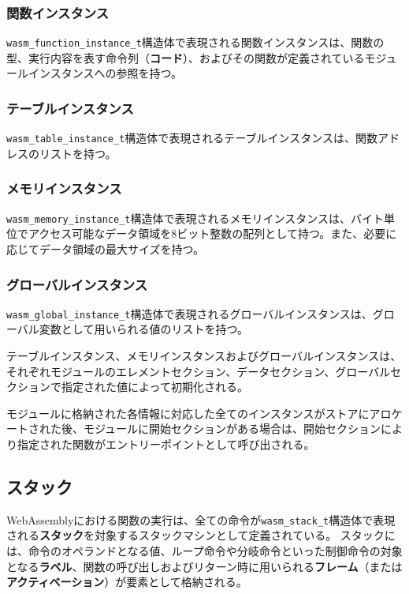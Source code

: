 \subsubsection{関数インスタンス}

\verb|wasm_function_instance_t|構造体で表現される関数インスタンスは、関数の型、実行内容を表す命令列（{\bf コード}）、およびその関数が定義されているモジュールインスタンスへの参照を持つ。

\subsubsection{テーブルインスタンス}

\verb|wasm_table_instance_t|構造体で表現されるテーブルインスタンスは、関数アドレスのリストを持つ。

\subsubsection{メモリインスタンス}

\verb|wasm_memory_instance_t|構造体で表現されるメモリインスタンスは、バイト単位でアクセス可能なデータ領域を8ビット整数の配列として持つ。また、必要に応じてデータ領域の最大サイズを持つ。

\subsubsection{グローバルインスタンス}

\verb|wasm_global_instance_t|構造体で表現されるグローバルインスタンスは、グローバル変数として用いられる値のリストを持つ。

テーブルインスタンス、メモリインスタンスおよびグローバルインスタンスは、それぞれモジュールのエレメントセクション、データセクション、グローバルセクションで指定された値によって初期化される。

モジュールに格納された各情報に対応した全てのインスタンスがストアにアロケートされた後、モジュールに開始セクションがある場合は、開始セクションにより指定された関数がエントリーポイントとして呼び出される。

\subsection{スタック}

WebAssemblyにおける関数の実行は、全ての命令が\verb|wasm_stack_t|構造体で表現される{\bf スタック}を対象するスタックマシンとして定義されている。
スタックには、命令のオペランドとなる値、ループ命令や分岐命令といった制御命令の対象となる{\bf ラベル}、関数の呼び出しおよびリターン時に用いられる{\bf フレーム}（または{\bf アクティベーション}）が要素として格納される。

